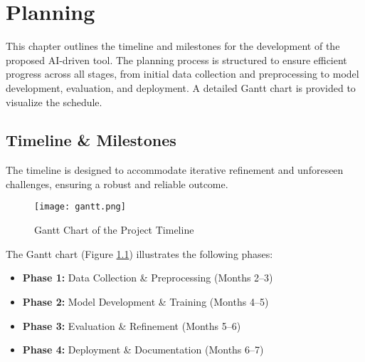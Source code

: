 
%

\chapter{Planning}
\label{cha:Planning}

This chapter outlines the timeline and milestones for the development of the proposed AI-driven tool. The planning process is structured to ensure efficient progress across all stages, from initial data collection and preprocessing to model development, evaluation, and deployment. A detailed Gantt chart is provided to visualize the schedule.
\section{Timeline \& Milestones}
The timeline is designed to accommodate iterative refinement and unforeseen challenges, ensuring a robust and reliable outcome.

\begin{figure}[h]
    \centering
    \texttt{[image: gantt.png]} 
    \caption{Gantt Chart of the Project Timeline}
    \label{fig:gantt}
\end{figure}

The Gantt chart (Figure \ref{fig:gantt}) illustrates the following phases:
\begin{itemize}
\item \textbf{Phase 1:} Data Collection \& Preprocessing (Months 2–3)
\item \textbf{Phase 2:} Model Development \& Training (Months 4–5)
\item \textbf{Phase 3:} Evaluation \& Refinement (Months 5–6)
\item \textbf{Phase 4:} Deployment \& Documentation (Months 6–7)
\end{itemize}